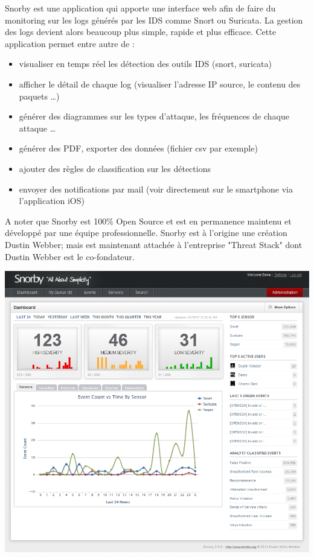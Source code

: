 \documentclass[a4paper,11pt,french]{article}
\begin{document}
Snorby est une application qui apporte une interface web afin de faire du monitoring sur les logs générés par les IDS comme Snort ou Suricata. La gestion des logs devient alors beaucoup plus simple, rapide et plus efficace. Cette application permet entre autre de :
\begin{itemize}
	\item visualiser en temps réel les détection des outils IDS (snort, suricata)
	\item afficher le détail de chaque log (visualiser l’adresse IP source, le contenu des paquets …)
	\item générer des diagrammes sur les types d’attaque, les fréquences de chaque attaque …
	\item générer des PDF, exporter des données (fichier csv par exemple)
	\item ajouter des règles de classification sur les détections
	\item envoyer des notifications par mail (voir directement sur le smartphone via l’application iOS)
\end{itemize}

A noter que Snorby est 100\% Open Source et est en permanence maintenu et développé par une équipe professionnelle. Snorby est à l’origine une création Dustin Webber; mais est maintenant attachée à l’entreprise "Threat Stack" dont Dustin Webber est le co-fondateur.

\begin{center}
\includegraphics[width=17cm]{icons/Snorby.png}
\end{center}
\end{document}
